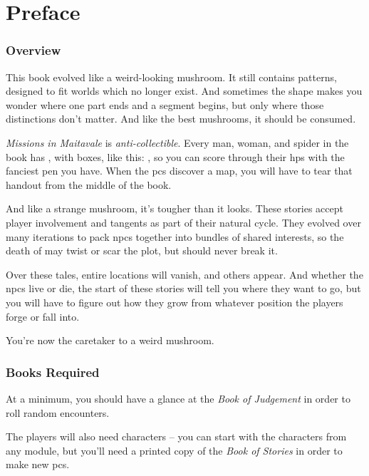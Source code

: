 \chapter{Preface}

\begin{multicols}{2}

\subsection*{Overview}

This book evolved like a weird-looking mushroom.
It still contains patterns, designed to fit worlds which no longer exist.
And sometimes the shape makes you wonder where one part ends and a segment begins, but only where those distinctions don't matter.
And like the best mushrooms, it should be consumed.

\textit{Missions in Maitavale} is \emph{anti-collectible}.
Every man, woman, and spider in the book has , with  boxes, like this: \setcounter{wounds}{2} \setcounter{freeHP}{3}\hpStat, so you can score through their \glspl{hp} with the fanciest pen you have.
When the \glspl{pc} discover a map, you will have to tear that handout from the middle of the book.
\setcounter{wounds}{0}

And like a strange mushroom, it's tougher than it looks.
These stories accept player involvement and tangents as part of their natural cycle.
They evolved over many iterations to pack \glspl{npc} together into bundles of shared interests, so the death of  may twist or scar the plot, but should never break it.

Over these tales, entire locations will vanish, and others appear.
And whether the \glspl{npc} live or die, the start of these stories will tell you where they want to go, but you will have to figure out how they grow from whatever position the players forge or fall into.

You're now the caretaker to a weird mushroom.

\subsection*{Books Required}

At a minimum, you should have a glance at the \textit{Book of Judgement} in order to roll random encounters.

The players will also need characters -- you can start with the characters from any module, but you'll need a printed copy of the \textit{Book of Stories} in order to make new \glspl{pc}.


\end{multicols}
